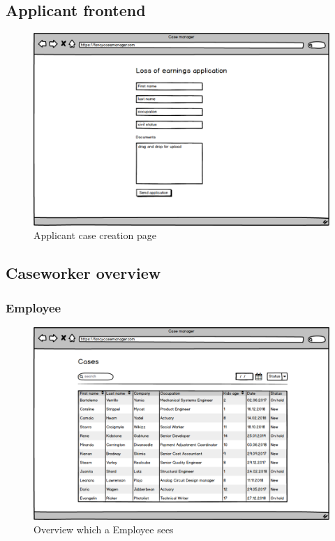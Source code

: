 \newpage
\subsection{Applicant frontend}
\begin{figure}[htb!]
    \centering
    \includegraphics[width=\textwidth]{img/page-applicant-case.png}
    \caption{Applicant case creation page}
\end{figure}

\newpage
\subsection{Caseworker overview}
\subsubsection{Employee}
\begin{figure}[htb!]
    \centering
    \includegraphics[width=\textwidth]{img/page-worker-overview.png}
    \caption{Overview which a Employee sees}
\end{figure}

